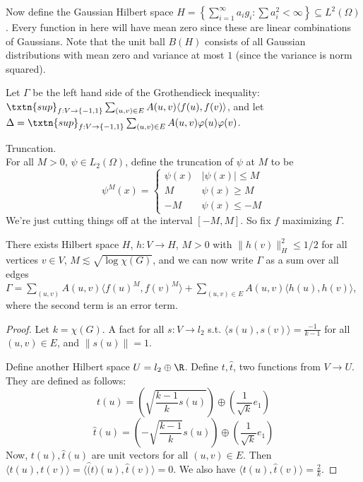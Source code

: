 Now define the Gaussian Hilbert space $H = \left\{\sum_{i = 1}^{\infty} a_i g_i: \sum a_i^2 < \infty\right\} \subseteq L^2(\Omega)$. Every function in here will have mean zero since these are linear combinations of Gaussians. Note that the unit ball $B(H)$ consists of all Gaussian distributions with mean zero and variance at most $1$ (since the variance is norm squared). 

Let $\Gamma$ be the left hand side of the Grothendieck inequality: $\txtn{sup}_{f: V \to \{-1, 1\}} \sum_{(u, v) \in E} A(u, v) \langle f(u), f(v) \rangle$, and let $\Delta = \txtn{sup}_{f: V \to \{-1, 1\}} \sum_{(u, v) \in E} A(u, v)\varphi(u)\varphi(v)$. 

\begin{df} Truncation. \\
For all $M > 0$, $\psi \in L_2(\Omega)$, define the truncation of $\psi$ at $M$ to be
\[
\psi^M(x) = 
\begin{cases}
\psi(x) & |\psi(x)| \leq M \\
M & \psi(x) \geq M \\
-M & \psi(x) \leq -M
\end{cases}
\] 
We're just cutting things off at the interval $[-M, M]$. 
So fix $f$ maximizing $\Gamma$. 

\begin{lem} There exists Hilbert space $H$, $h: V \to H$, $M > 0$ with $\|h(v)\|_H^2 \leq 1/2$ for all vertices $v \in V$, $M \lesssim \sqrt{\log \chi(G)}$, and we can now write $\Gamma$ as a sum over all edges $\Gamma = \sum_{(u, v)} A(u, v) \langle f(u)^M, f(v)^M \rangle + \sum_{(u, v) \in E} A(u, v) \langle h(u), h(v) \rangle$, where the second term is an error term. 
\end{lem}
\begin{proof}
Let $k = \chi(G)$. A fact for all $s: V \to l_2$ s.t. $\langle s(u), s(v) \rangle = \frac{-1}{k - 1}$ for all $(u, v) \in E$, and $\|s(u)\| = 1$. 

Define another Hilbert space $U = l_2 \oplus \R$. Define $t, \hat{t}$, two functions from $V \to U$. They are defined as follows: 
\[
t(u) = (\sqrt{\frac{k - 1}{k} s(u)}) \oplus (\frac{1}{\sqrt{k}}e_1)
\]
\[
\hat{t}(u) = (-\sqrt{\frac{k - 1}{k}}s(u)) \oplus (\frac{1}{\sqrt{k}}e_1)
\]
Now, $t(u), \hat{t}(u)$ are unit vectors for all $(u, v) \in E$. Then $\langle t(u), t(v) \rangle = \langle \hat(t)(u), \hat{t}(v) \rangle = 0$. 
We also have $\langle t(u), \hat{t}(v) \rangle = \frac{2}{k}$. 


\end{proof}
\end{df}
